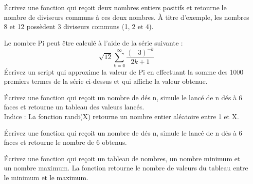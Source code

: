 \documentclass[french]{article}
\begin{document}
\begin{question}{6}
	Écrivez une fonction qui reçoit deux nombres entiers positifs et retourne le nombre de diviseurs communs à ces deux nombres. À titre d’exemple, les nombres 8 et 12 possèdent 3 diviseurs communs (1, 2 et 4).
\end{question}
\vfill
\begin{solution}
	
\end{solution}
\newpage

\begin{question}{5}
	Le nombre Pi peut être calculé à l'aide de la série suivante : 
	\[ \sqrt{12}\sum_{k=0}^{\infty}\frac{(-3)^{-k}}{2k+1}\]
	Écrivez un script qui approxime la valeur de Pi en effectuant la somme des 1000 premiers termes de la série ci-dessus et qui affiche la valeur obtenue.
\end{question}
\vfill
\begin{solution}
	
\end{solution}
\newpage

\begin{question}{7}
	Écrivez une fonction qui reçoit un nombre de dés n, simule le lancé de n dés à 6 faces et retourne un tableau des valeurs lancés.\\
Indice : La fonction randi(X) retourne un nombre entier aléatoire entre 1 et X.
\end{question}
\vfill
\begin{solution}
	
\end{solution}
\newpage

\begin{question}{7}
	Écrivez une fonction qui reçoit un nombre de dés n, simule le lancé de n dés à 6 faces et retourne le nombre de 6 obtenus.\\
\end{question}
\vfill
\begin{solution}
	
\end{solution}
\newpage

\begin{question}{7}
	Écrivez une fonction qui reçoit un tableau de nombres, un nombre minimum et un nombre maximum. La fonction retourne le nombre de valeurs du tableau entre le minimum et le maximum.
\end{question}
\vfill
\begin{solution}
	
\end{solution}
\newpage
\end{document}
